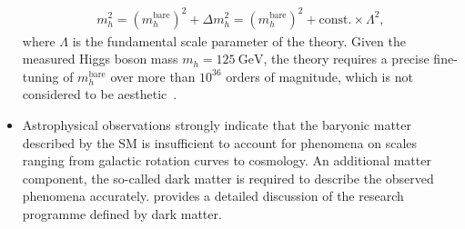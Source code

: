 \begin{itemize}
    \begin{align}
        m_{h}^{2} = (m_{h}^{\text{bare}})^2 + \Delta m_{h}^2 = (m_{h}^{\text{bare}})^2 + \text{const.} \times \Lambda^2,
    \end{align}
    where \(\Lambda\) is the fundamental scale parameter of the theory.
    Given the measured Higgs boson mass  \(m_{h} = \SI{125}{\giga\electronvolt}\), the theory requires a precise fine-tuning of \(m_{h}^{\text{bare}}\) over more than \(10^{36}\) orders of magnitude, which is not considered to be aesthetic~\cite{Murayama2000}.
    \item Astrophysical observations strongly indicate that the baryonic matter described by the SM is insufficient to account for phenomena on scales ranging from galactic rotation curves to cosmology. An additional matter component, the so-called dark matter is required to describe the observed phenomena accurately.  provides a detailed discussion of the research programme defined by dark matter.
\end{itemize}
